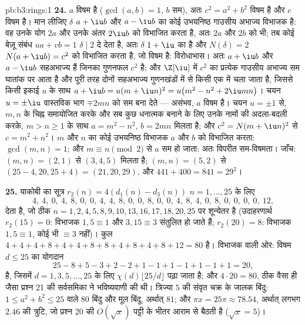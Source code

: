 \begin{solution}{pb:b3:rings:1}
\textbf{24.} $a$ विषम है ($\gcd(a, b) = 1$, $b$ सम), अतः $c^2
= a^2 + b^2$ विषम है और
$c$ विषम है। मान लीजिए $\delta$ $a + \iu b$ और $a - \iu b$ का कोई उभयनिष्ठ गाउसीय
अभाज्य विभाजक है: वह उनके योग $2a$ और उनके अंतर $2\iu b$ को विभाजित
करता है, अतः $2a$ और $2b$ को भी; तब कोई बेज़ू संबंध $ua + vb = 1$ $\delta \mid 2$
दे देता है, अतः $\delta$ $1 + \iu$ का  है और $N(\delta) = 2$ $N(a + \iu b) = c^2$ को विभाजित
करता है, जो विषम है: विरोधाभास। अतः $a + \iu b$ और $a - \iu b$ सहअभाज्य हैं
जिनका गुणनफल $c^2$ है; और  $\Z[\iu]$ में $c^2$ का प्रत्येक गाउसीय
अभाज्य सम घातांक पर आता है और पूरी तरह दोनों सहअभाज्य गुणनखंडों में
से किसी एक में चला जाता है, जिससे किसी इकाई $u$ के साथ $a + \iu b = u(m + \iu
n)^2 = u\bigl(m^2 - n^2 + 2\iu mn\bigr)$।
चयन $u = \pm\iu$ वास्तविक भाग $\mp 2mn$ को सम बना देते --- असंभव, $a$ विषम
है। चयन $u = \pm1$ से, $m, n$ के चिह्न समायोजित करके और सब कुछ धनात्मक
बनाने के लिए उनके नामों की अदला-बदली करके, $m > n
\geq 1$ के साथ $a = m^2 - n^2$, $b = 2mn$
मिलता है; और $c^2 = N(m + \iu n)^2$ से $c = m^2 + n^2$। $m$ और $n$ का कोई उभयनिष्ठ विभाजक
$a$ और $b$ को विभाजित करता: $\gcd
(m, n) = 1$; और $m \equiv n \pmod 2$ से $a$ सम हो जाता:
अतः विपरीत सम-विषमता। जाँच: $(m, n) = (2, 1)$ से $(3, 4,
5)$ मिलता है; $(m, n) = (5, 2)$ से $(25 - 4, 20, 25 + 4) = (21, 20,
29)$,
और $441 + 400 = 841 = 29^2$।

\textbf{25.} याकोबी का सूत्र $r_2(n) = 4(d_1(n) - d_3(n))$ $n = 1, \dots, 25$ के लिए
\[
4,\ 4,\ 0,\ 4,\ 8,\ 0,\ 0,\ 4,\ 4,\ 8,\ 0,\ 0,\ 8,\ 0,\ 0,\
4,\ 8,\ 4,\ 0,\ 8,\ 0,\ 0,\ 0,\ 0,\ 12,
\]
देता है, जो ठीक $n = 1, 2, 4, 5, 8, 9, 10, 13, 16, 17, 18,
20, 25$ पर शून्येतर है (उदाहरणार्थ $r_2(15) = 0$: विभाजक $1, 5 \equiv 1$
और $3, 15 \equiv 3$ संतुलित हो जाते हैं; $r_2(20) = 8$: विभाजक $1, 5
\equiv 1$, कोई भी $\equiv 3$
नहीं)। कुल $4 + 4 + 4 + 8 + 4 +
4 + 8 + 8 + 4 + 8 + 4 + 8 + 12 = 80$ है। विभाजक वाली ओर: विषम $d \leq 25$ का योगदान
\[
25 - 8 + 5 - 3 + 2 - 2 + 1 - 1 + 1 - 1 + 1 - 1 + 1 = 20,
\]
है, जिसमें $d = 1, 3, 5, \dots,
25$ के लिए $\chi(d)\lfloor 25/d\rfloor$ पढ़ा जाता है; और $4 \cdot 20 = 80$, ठीक वैसा ही
जैसा प्रश्न 21 की सर्वसमिका ने भविष्यवाणी की थी। त्रिज्या $5$ की
संवृत चक्र के जालक बिंदु: $1 \leq a^2 + b^2 \leq 25$ वाले $80$ बिंदु और मूल बिंदु,
अर्थात् $81$; और $\pi x = 25\pi \approx 78.54$, अर्थात् लगभग $2.46$ की त्रुटि, जो प्रश्न 20
की $O(\sqrt x)$ पट्टी के भीतर आराम से बैठती है ($\sqrt x = 5$)।
\end{solution}
